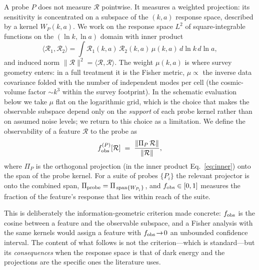 \documentclass[twocolumn,10pt]{article}
\newcommand{\obs}{f_{\rm obs}}
\begin{document}
A probe $P$ does not measure $\mathcal{R}$ pointwise. It measures a weighted
projection: its sensitivity is concentrated on a subspace of the $(k,a)$
response space, described by a kernel $W_P(k,a)$. We work on the response space
$L^2$ of square-integrable functions on the $(\ln k,\ln a)$ domain with inner
product
\begin{equation}
\langle \mathcal{R}_1,\mathcal{R}_2\rangle
=\int \mathcal{R}_1(k,a)\,\mathcal{R}_2(k,a)\,\mu(k,a)\,d\ln k\,d\ln a,
\label{eq:inner}
\end{equation}
and induced norm $\|\mathcal{R}\|^2=\langle\mathcal{R},\mathcal{R}\rangle$. The
weight $\mu(k,a)$ is where survey geometry enters: in a full treatment it is the
Fisher metric, $\mu\propto$ the inverse data covariance folded with the number
of independent modes per cell (the cosmic-volume factor $\sim k^3$ within the
survey footprint). In the schematic evaluation below we take $\mu$ flat on the
logarithmic grid, which is the choice that makes the observable subspace depend
only on the \emph{support} of each probe kernel rather than on assumed noise
levels; we return to this choice as a limitation. We define the observability of
a feature $\mathcal{R}$ to the probe as
\begin{equation}
\obs^{(P)}[\mathcal{R}]
   \;=\; \frac{\|\Pi_P\,\mathcal{R}\|}{\|\mathcal{R}\|},
\label{eq:obsfunc}
\end{equation}
where $\Pi_P$ is the orthogonal projection (in the inner product
Eq.~\eqref{eq:inner}) onto the span of the probe kernel. For a suite of probes
$\{P_i\}$ the relevant projector is onto the combined span,
$\Pi_{\rm probe}=\Pi_{\,{\rm span}\{W_{P_i}\}}$, and $\obs\in[0,1]$ measures the
fraction of the feature's response that lies within reach of the suite.

This is deliberately the information-geometric criterion made concrete: $\obs$
is the cosine between a feature and the observable subspace, and a Fisher
analysis with the same kernels would assign a feature with $\obs\!\to\!0$ an
unbounded confidence interval. The content of what follows is not the
criterion---which is standard---but its \emph{consequences} when the response
space is that of dark energy and the projections are the specific ones the
literature uses.
\end{document}
